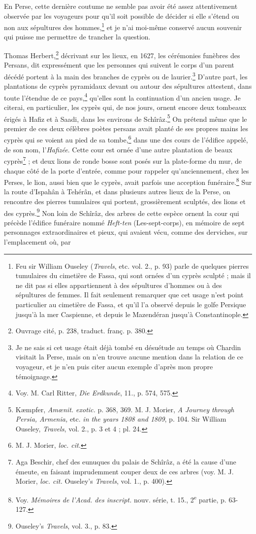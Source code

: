 \documentclass{article}
\begin{document}
En Perse, cette dernière coutume ne semble pas avoir été assez attentivement observée par les voyageurs pour qu'il soit possible de décider si elle s'étend ou non aux sépultures des hommes,\footnote{Feu sir William Ouseley (\emph{Travels}, etc. vol. 2., p. 93) parle de quelques pierres tumulaires du cimetière de Fassa, qui sont ornées d'un cyprès sculpté ; mais il ne dit pas si elles appartiennent à des sépultures d'hommes ou à des sépultures de femmes. Il fait seulement remarquer que cet usage n'est point particulier au cimetière de Fassa, et qu'il l'a observé depuis le golfe Persique jusqu'à la mer Caspienne, et depuis le Mazendéran jusqu'à Constantinople.} et je n'ai moi-même conservé aucun souvenir qui puisse me permettre de trancher la question.

Thomas Herbert,\footnote{Ouvrage cité, p. 238, traduct. franç. p. 380.} décrivant sur les lieux, en 1627, les cérémonies funèbres des Persans, dit expressément que les personnes qui suivent le corps d'un parent décédé portent à la main des branches de cyprès ou de laurier.\footnote{Je ne sais si cet usage était déjà tombé en désuétude au temps où Chardin visitait la Perse, mais on n'en trouve aucune mention dans la relation de ce voyageur, et je n'en puis citer aucun exemple d'après mon propre témoignage.} D'autre part, les plantations de cyprès pyramidaux devant ou autour des sépultures attestent, dans toute l'étendue de ce pays,\footnote{Voy. M. Carl Ritter, \emph{Die Erdkunde}, 11., p. 574, 575.} qu'elles sont la continuation d'un ancien usage. Je citerai, en particulier, les cyprès qui, de nos jours, ornent encore deux tombeaux érigés à Hafiz et à Saadi, dans les environs de Schîrâz.\footnote{Kæmpfer, \emph{Amœnit. exotic.} p. 368, 369. M. J. Morier, \emph{A Journey through Persia, Armenia,} etc. \emph{in the years 1808 and 1809}, p. 104. Sir William Ouseley, \emph{Travels}, vol. 2., p. 3 et 4 ; pl. 24.} On prétend même que le premier de ces deux célèbres poètes persans avait planté de ses propres mains les cyprès qui se voient au pied de sa tombe,\footnote{M. J. Morier, \emph{loc. cit.}} dans une des cours de l'édifice appelé, de son nom, l'\emph{Hafizée}. Cette cour est ornée d'une autre plantation de beaux cyprès\footnote{Aga Beschir, chef des eunuques du palais de Schîrâz, a été la cause d'une émeute, en faisant imprudemment couper deux de ces arbres (voy. M. J. Morier, \emph{loc. cit.} Ouseley's \emph{Travels}, vol. 1., p. 400).} ; et deux lions de ronde bosse sont posés sur la plate-forme du mur, de chaque côté de la porte d'entrée, comme pour rappeler qu'anciennement, chez les Perses, le lion, aussi bien que le cyprès, avait parfois une acception funéraire.\footnote{Voy. \emph{Mémoires de l'Acad. des inscript.} nouv. série, t. 15., 2\textsuperscript{e} partie, p. 63-127.} Sur la route d'Ispahân à Tehérân, et dans plusieurs autres lieux de la Perse, on rencontre des pierres tumulaires qui portent, grossièrement sculptés, des lions et des cyprès.\footnote{Ouseley's \emph{Travels}, vol. 3., p. 83.} Non loin de Schîrâz, des arbres de cette espèce ornent la cour qui précède l'édifice funéraire nommé \emph{Heft-ten} (Les-sept-corps), en mémoire de sept personnages extraordinaires et pieux, qui avaient vécu, comme des derviches, sur l'emplacement où, par 
\end{document}
